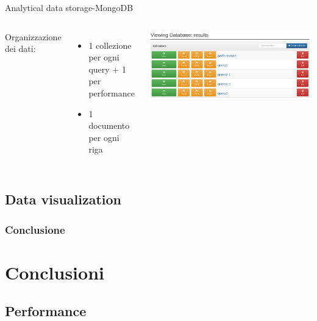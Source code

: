 \documentclass[13pt,aspectratio=169,t,xcolor=table]{beamer}
\begin{document}
\begin{frame}{Analytical data storage-MongoDB}
    \vspace{0.5cm}
    \begin{columns}
            \begin{minipage}[b]{1\textwidth}
                Organizzazione dei dati:
                \begin{itemize}
                    \item 1 collezione per ogni query + 1 per performance
                    \item 1 documento per ogni riga
                \end{itemize}
            \end{minipage}
            \begin{minipage}{1\textwidth}
                \begin{adjustbox}{margin=0cm 0cm 1.5cm 0cm, center}
                    \includegraphics[width=1\textwidth]{res/mongo.png}
                \end{adjustbox}
            \end{minipage}
    \end{columns}
\end{frame}

\subsection{Data visualization}

\begin{frame}{}
    \frametitle{Conclusione}
\end{frame}
\section{Conclusioni}
\subsection{Performance}
\end{document}
